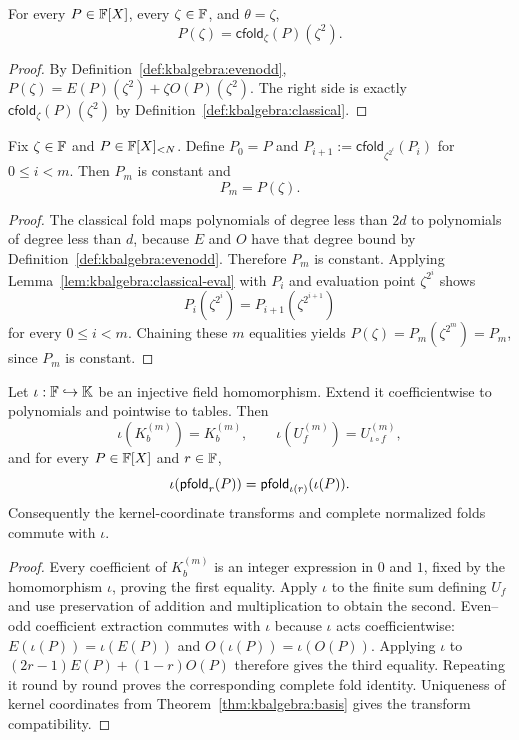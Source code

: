 \begin{lemma}\label{lem:kbalgebra:classical-eval}
For every $P\in\mathbb{F}[X]$, every $\zeta\in\mathbb{F}$, and $\theta=\zeta$,
\[
 P(\zeta)=\mathsf{cfold}_{\zeta}(P)(\zeta^2).
\]
\end{lemma}
\begin{proof}
By Definition~\ref{def:kbalgebra:evenodd}, $P(\zeta)=E(P)(\zeta^2)+\zeta O(P)(\zeta^2)$. The right side is exactly $\mathsf{cfold}_\zeta(P)(\zeta^2)$ by Definition~\ref{def:kbalgebra:classical}.
\end{proof}

\begin{theorem}\label{thm:kbalgebra:classical-evaluation}
Fix $\zeta\in\mathbb{F}$ and $P\in\mathbb{F}[X]_{<N}$. Define $P_0=P$ and $P_{i+1}:=\mathsf{cfold}_{\zeta^{2^i}}(P_i)$ for $0\leq i<m$. Then $P_m$ is constant and
\[
 \boxed{P_m=P(\zeta).}
\]
\end{theorem}
\begin{proof}
The classical fold maps polynomials of degree less than $2d$ to polynomials of degree less than $d$, because $E$ and $O$ have that degree bound by Definition~\ref{def:kbalgebra:evenodd}. Therefore $P_m$ is constant. Applying Lemma~\ref{lem:kbalgebra:classical-eval} with $P_i$ and evaluation point $\zeta^{2^i}$ shows
\[
 P_i(\zeta^{2^i})=P_{i+1}(\zeta^{2^{i+1}})
\]
for every $0\leq i<m$. Chaining these $m$ equalities yields $P(\zeta)=P_m(\zeta^{2^m})=P_m$, since $P_m$ is constant.
\end{proof}

\begin{lemma}\label{lem:kbalgebra:naturality}
Let $\iota:\mathbb{F}\hookrightarrow\mathbb K$ be an injective field homomorphism. Extend it coefficientwise to polynomials and pointwise to tables. Then
\[
 \iota(K_b^{(m)})=K_b^{(m)},\qquad
 \iota(U_f^{(m)})=U_{\iota\circ f}^{(m)},
\]
and for every $P\in\mathbb{F}[X]$ and $r\in\mathbb{F}$,
\[
 \iota(\mathsf{pfold}_r(P))=\mathsf{pfold}_{\iota(r)}(\iota(P)).
\]
Consequently the kernel-coordinate transforms and complete normalized folds commute with $\iota$.
\end{lemma}
\begin{proof}
Every coefficient of $K_b^{(m)}$ is an integer expression in $0$ and $1$, fixed by the homomorphism $\iota$, proving the first equality. Apply $\iota$ to the finite sum defining $U_f$ and use preservation of addition and multiplication to obtain the second. Even--odd coefficient extraction commutes with $\iota$ because $\iota$ acts coefficientwise: $E(\iota(P))=\iota(E(P))$ and $O(\iota(P))=\iota(O(P))$. Applying $\iota$ to $(2r-1)E(P)+(1-r)O(P)$ therefore gives the third equality. Repeating it round by round proves the corresponding complete fold identity. Uniqueness of kernel coordinates from Theorem~\ref{thm:kbalgebra:basis} gives the transform compatibility.
\end{proof}

